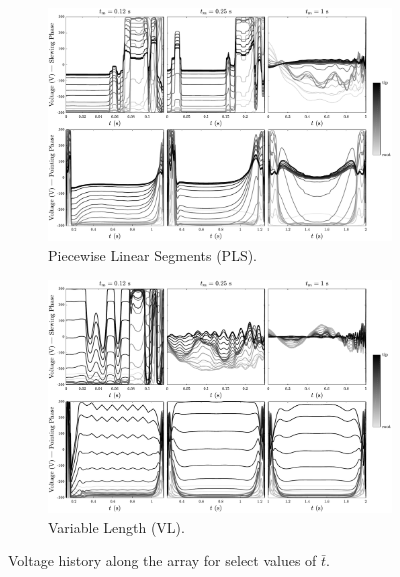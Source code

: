 \begin{figure}[p]
    \centering
    \begin{subfigure}[b]{0.85\textwidth}
      \centering
      \includegraphics[width=\columnwidth]{../ch7/figures/VoltagePLS.pdf}
      \caption{Piecewise Linear Segments (PLS).} \label{fig:ch7:voltage_pls}
    \end{subfigure}
    \begin{subfigure}[b]{0.85\textwidth}
      \centering
      \includegraphics[width=\columnwidth]{../ch7/figures/VoltageVL.pdf}
      \caption{Variable Length (VL).} \label{fig:ch7:voltage_vl}
    \end{subfigure}
    \caption{Voltage history along the array for select values of $\bar{t}$.\label{fig:ch7:voltage}}
\end{figure}